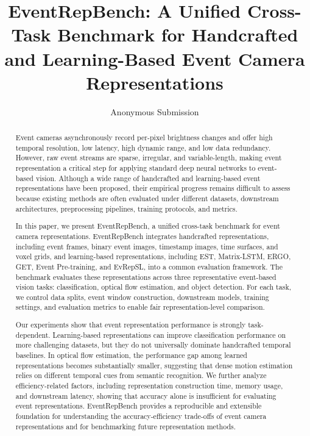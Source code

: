 \documentclass[letterpaper]{article}
\title{EventRepBench: A Unified Cross-Task Benchmark for Handcrafted and Learning-Based Event Camera Representations}
\author{
    Anonymous Submission
}
\begin{document}
\maketitle

\begin{abstract}
Event cameras asynchronously record per-pixel brightness changes and offer high temporal resolution, low latency, high dynamic range, and low data redundancy. However, raw event streams are sparse, irregular, and variable-length, making event representation a critical step for applying standard deep neural networks to event-based vision. Although a wide range of handcrafted and learning-based event representations have been proposed, their empirical progress remains difficult to assess because existing methods are often evaluated under different datasets, downstream architectures, preprocessing pipelines, training protocols, and metrics.

In this paper, we present EventRepBench, a unified cross-task benchmark for event camera representations. EventRepBench integrates handcrafted representations, including event frames, binary event images, timestamp images, time surfaces, and voxel grids, and learning-based representations, including EST, Matrix-LSTM, ERGO, GET, Event Pre-training, and EvRepSL, into a common evaluation framework. The benchmark evaluates these representations across three representative event-based vision tasks: classification, optical flow estimation, and object detection. For each task, we control data splits, event window construction, downstream models, training settings, and evaluation metrics to enable fair representation-level comparison.

Our experiments show that event representation performance is strongly task-dependent. Learning-based representations can improve classification performance on more challenging datasets, but they do not universally dominate handcrafted temporal baselines. In optical flow estimation, the performance gap among learned representations becomes substantially smaller, suggesting that dense motion estimation relies on different temporal cues from semantic recognition. We further analyze efficiency-related factors, including representation construction time, memory usage, and downstream latency, showing that accuracy alone is insufficient for evaluating event representations. EventRepBench provides a reproducible and extensible foundation for understanding the accuracy-efficiency trade-offs of event camera representations and for benchmarking future representation methods.
\end{abstract}
\end{document}
